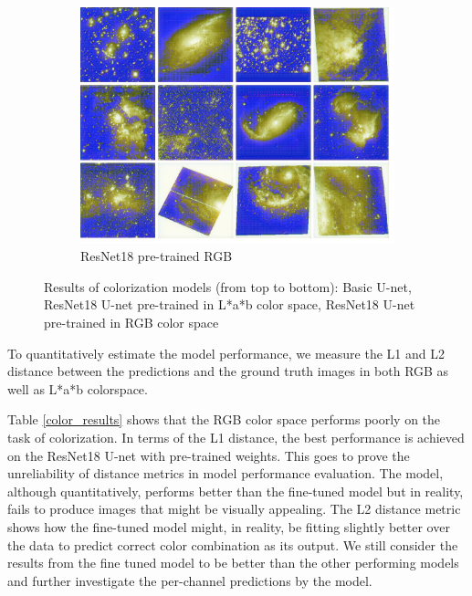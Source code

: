\documentclass[oneside,a4paper,12pt]{report}
\begin{document}
\begin{figure}[!htb]
	\begin{subfigure}[b]{0.5\textwidth}
		\centering
		\includegraphics[width=\textwidth]{figures/samples_coco}
		\caption{ResNet18 pre-trained RGB}
		\label{fig: resnet18_rgb}
	\end{subfigure}
	\caption{Results of colorization models (from top to bottom): Basic U-net, ResNet18 U-net pre-trained in L*a*b color space, ResNet18 U-net pre-trained in RGB color space}
	\label{fig: comparisons}
\end{figure}

\pagebreak

To quantitatively estimate the model performance, we measure the L1 and L2 distance between the predictions and the ground truth images in both RGB as well as L*a*b colorspace. 



Table \ref{color_results} shows that the RGB color space performs poorly on the task of colorization. In terms of the L1 distance, the best performance is achieved on the ResNet18 U-net with pre-trained weights. This goes to prove the unreliability of distance metrics in model performance evaluation. The model, although quantitatively, performs better than the fine-tuned model but in reality, fails to produce images that might be visually appealing. The L2 distance metric shows how the fine-tuned model might, in reality, be fitting slightly better over the data to predict correct color combination as its output. We still consider the results from the fine tuned model to be better than the other performing models and further investigate the per-channel predictions by the model.
\end{document}
